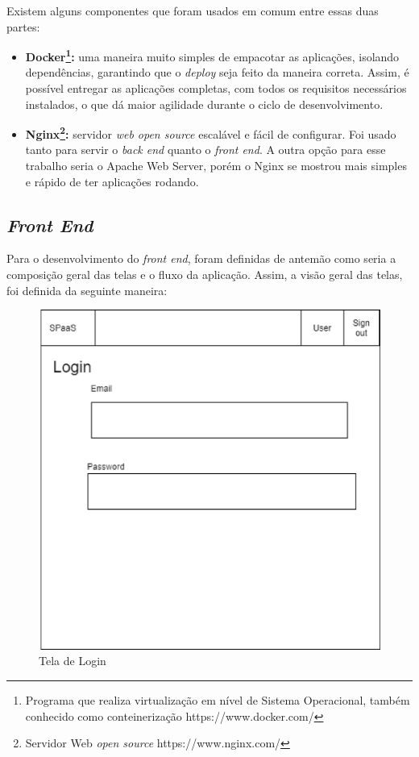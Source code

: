 \documentclass[11pt,twoside]{article}
\begin{document}
Existem alguns componentes que foram usados em comum entre essas duas partes:

\begin{itemize}
  \item \textbf{Docker\footnote{Programa que realiza virtualização em nível de Sistema Operacional, também conhecido como conteinerização https://www.docker.com/}:} 
  uma maneira muito simples de empacotar as aplicações, isolando dependências, garantindo que o \emph{deploy} seja feito da maneira correta. Assim, é possível entregar as aplicações completas, com
  todos os requisitos necessários instalados, o que dá maior agilidade durante o ciclo de desenvolvimento.
  \item \textbf{Nginx\footnote{Servidor Web \emph{open source} https://www.nginx.com/}:} servidor \emph{web open source} escalável e fácil de configurar. Foi usado tanto para servir o \emph{back end} quanto o \emph{front end}. 
  A outra opção para esse trabalho seria o Apache Web Server, porém o Nginx se mostrou mais simples e rápido de ter aplicações rodando.
\end{itemize}

\subsection{\emph{Front End}}

Para o desenvolvimento do \emph{front end}, foram definidas de antemão como seria a composição geral das telas e o fluxo da aplicação. Assim, a visão geral das telas, foi definida da seguinte maneira:

\begin{figure}[!h]
  \centering
  \includegraphics[scale=0.4]{login.eps}
  \caption{Tela de Login}
  \label{fig:loginScreen}
\end{figure}
\end{document}
